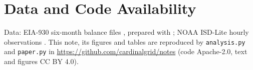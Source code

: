 \documentclass[conference]{IEEEtran}
\begin{document}
\section*{Data and Code Availability}
Data: EIA-930 six-month balance files \cite{eia930monitor}, prepared with \cite{guerra2026scorecard}; NOAA ISD-Lite hourly observations \cite{isdlite}. This note, its figures and tables are reproduced by \texttt{analysis.py} and \texttt{paper.py} in \url{https://github.com/cardinalgrid/notes} (code Apache-2.0, text and figures CC BY 4.0).



\end{document}
